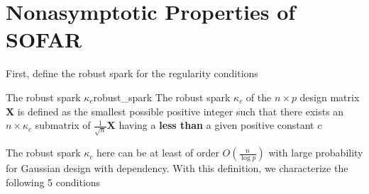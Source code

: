 \documentclass[twoside]{article}
\begin{document}
\section{Nonasymptotic Properties of SOFAR}
First, define the robust spark for the regularity conditions
\begin{definition}{The robust spark $\kappa_c$}{robust_spark}
    The robust spark $\kappa_c$ of the $n\times p$ design matrix $\mathbf{X}$ is defined as the smallest possible positive integer such that there exists an $n\times \kappa_c$ submatrix of $\frac{1}{\sqrt{n}}\mathbf{X}$ having a  \textbf{less than} a given positive constant $c$
\end{definition}
The robust spark $\kappa_c$ here can be at least of order $O\left( \frac{n}{\log p} \right)$ with large probability for Gaussian design with dependency. With this definition, we characterize the following 5 conditions
\end{document}
